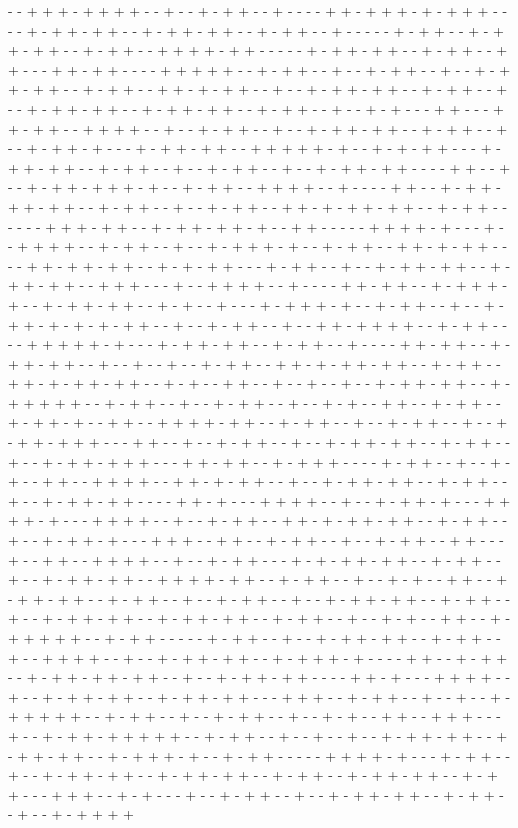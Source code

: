- - + + + - + + + + - - + - - + - + + - - + - - - - + + - + + + - + - + + + - - - - + - + + - + + - - + - + + - + + - - + - + + - - + - - - - - + - + + - - + - + + - + + - - + - + + - - + + + + - + + - - - - - + - + + - + + - - + - + + - - + + - - - + + - + + - - - - + + + + + - - + - + + - - + - - + - + + - - + - - + - + + - + + - - + - + + - - + + - + - + + - - + - - + - + + - + + - - + - + + - - + - - + - + + - + + - - + - + + - + + - - + - + + - - + - - + - + - - - + + - - - + + - + + - - + + + + - - + - - + - + + - - + - - + - + + - + + - - + - + + - - + - - + - + + - + - - - + - + + - + + - - + + + + + - + - - + - + - + + - - - + - + + - + + - - + - + + - - + - - + - + + - - + - - + - + + - + + - - - - + + - - + - - + - + + - + + + - + - - + - + + - - + + + + - - + - - - - + + - - + - + + - + + - + + - - + - + + - - + - - + - + + - - + + - + - + + - + + - - + - + + - - - - - - + + + - + + - - + - + + - + + - + - - + + - - - - - + + + + - + - - - + - - + + + + - - + - + + - - + - - + - + + + - + - - + - + + - - + + - + - + + - - - - + + - + + - + + - - + - + - + + - - - + - + + - - + - - + - + + - + + - - + - + + - + + - - + + + - - - + - - + + + + - - + - - - - + + - + + - - + - + + + - + - - + - + + - + + - - + - + - - + - - - + - + + + - + - - + - + + - - + - - + - + + - + - + - + - + + - - + - - + - + + - - + - - + + - + + + + - - + - + + - - - - + + + + + - + - - - + - + + - + + - - + - + + - - + - - - - + + - + + - - + - + + - + + - - + - - + - - + - - + - + + - - + + - + - + + - + + - - + - + + - - + + - + - + + - + + - - + - + - - + + - - + - - + - - + - - + - + + - + + - - + - + + + + + - - + - + + - - + - - + - + + - - + - - + - + - - + + - - + - + + - - + - + + - + - - + + - - + + + + - + + - - + - + + - - + - - + - + + - - + - - + - + + - + + + - - - + + - - + - - + - + + - - + - - + - + + - + + - - + - + + - - + - - + - + + - + + + - - - + + - + + - - + - + + + - - - - + - + + - - + - - + - + - - + + - - + + + + - - + + - + - + + - - + - - + - + + - + + - - + - + + - - + - - + - + + - + + - - - - + + - + - - - + + + + - - + - - + - + + - + - - - + + + + - + - - - + + + + - - + - - + - + + - - + + - + - + + - + + - - + - + + - - + - - + - + + - + - - - + + + - - + + - - + - + + - - + - - + - + + - - + + - - - + - - + + - - + + + + - - + - - + - + + - - - + - + - + + - + + - - + - + + - - + - - + - + + - + + - - + + + + - + + - - + - + + - - + - - + - + - - + + - - + - + + - + + - - + - + + - - + - - + - + + - - + - - + - + + - + + - - + - + + - - + - - + - + + - + + - - + - + + - + + - - + - + + - - + - - + - + - - + + - - + - + + + + + - - + - + + - - - - - + - + + - - + - - + - + + - + + - - + - + + - - + - - + + + + - - + - - + - + + - + + - - + - + + + - + - - - - + + - - + - + + - - + - + + - + + - + + - - + - - + - + + - + + - - - - + + - + - - - + + + + - - + - - + - + + - + + - - + - + + - + + - - - + + + - - + - + + - - + - - + - - + - + + + + + - - + - + + - - + - - + - + + - - + - - + - + - - + + - - + + + - - - + - - + - + + - + + + + + - - + - + + - - + - - + - - + - - + - + + - + + - - + - + + - + + - - + - + + + - + - - + - + + - - - - - + + + + - + - - - + - + + - - + - - + - + + - + + - - + - + + - + + - - + - + + - - + - + + - + + - - + - + + - - - + + + - - + - + - - - + - - + - + + - - + - - + - + + - + + - - + - + + - - + - - + - + + + + 